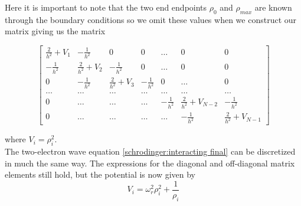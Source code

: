 \documentclass[12pt]{article}
\numberwithin{figure}{section}
\numberwithin{table}{section}
\begin{document}
\noindent Here it is important to note that the two end endpoints $\rho_0$ and $\rho_{max}$ are known through the boundary conditions so we omit  these values when we construct our matrix giving us the matrix \cite{pro2} 

\begin{equation}
    \begin{bmatrix} \frac{2}{h^2}+V_1 & -\frac{1}{h^2} & 0   & 0    & \dots  &0     & 0 \\
                                -\frac{1}{h^2} & \frac{2}{h^2}+V_2 & -\frac{1}{h^2} & 0    & \dots  &0     &0 \\
                                0   & -\frac{1}{h^2} & \frac{2}{h^2}+V_3 & -\frac{1}{h^2}  &0       &\dots & 0\\
                                \dots  & \dots & \dots & \dots  &\dots      &\dots & \dots\\
                                0   & \dots & \dots & \dots  &-\frac{1}{h^2}  &\frac{2}{h^2}+V_{N-2} & -\frac{1}{h^2}\\
                                0   & \dots & \dots & \dots  &\dots       &-\frac{1}{h^2} & \frac{2}{h^2}+V_{N-1}
             \end{bmatrix} \label{eq:relevantA}
\end{equation}

\noindent where $V_i=\rho_i^2$. \\

\noindent The two-electron wave equation \eqref{schrodinger:interacting final} can be discretized in much the same way. The expressions for the diagonal and off-diagonal matrix elements still hold, but the potential is now given by
$$V_i=\omega_r^2\rho_i^2+\frac{1}{\rho_i}$$


\end{document}

